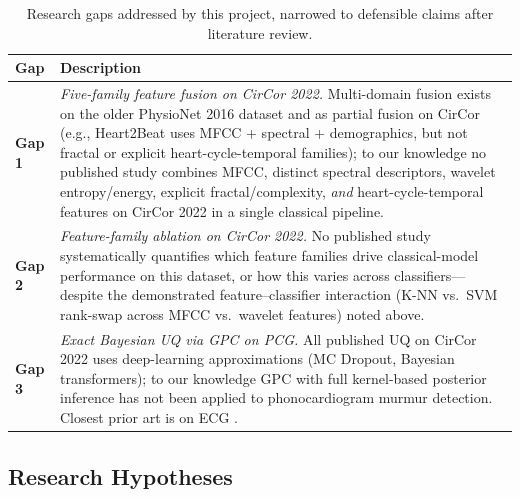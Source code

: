 \documentclass[10pt,twocolumn]{article}
\begin{document}
\begin{table}[H]
\centering
\caption{Research gaps addressed by this project, narrowed to defensible claims after literature review.}
\label{tab:gaps}
\small
\begin{tabular}{p{1.2cm}p{5.8cm}}
\toprule
\textbf{Gap} & \textbf{Description} \\
\midrule
\textbf{Gap 1} & \textit{Five-family feature fusion on CirCor 2022.} Multi-domain fusion exists on the older PhysioNet 2016 dataset and as partial fusion on CirCor (e.g., Heart2Beat \citep{rohr2024heart2beat} uses MFCC + spectral + demographics, but not fractal or explicit heart-cycle-temporal families); to our knowledge no published study combines MFCC, distinct spectral descriptors, wavelet entropy/energy, explicit fractal/complexity, \textit{and} heart-cycle-temporal features on CirCor 2022 in a single classical pipeline. \\
\midrule
\textbf{Gap 2} & \textit{Feature-family ablation on CirCor 2022.} No published study systematically quantifies which feature families drive classical-model performance on this dataset, or how this varies across classifiers---despite the demonstrated feature--classifier interaction (K-NN vs.\ SVM rank-swap across MFCC vs.\ wavelet features) noted above. \\
\midrule
\textbf{Gap 3} & \textit{Exact Bayesian UQ via GPC on PCG.} All published UQ on CirCor 2022 uses deep-learning approximations (MC Dropout, Bayesian transformers); to our knowledge GPC with full kernel-based posterior inference has not been applied to phonocardiogram murmur detection. Closest prior art is on ECG \citep{muygps2024}. \\
\bottomrule
\end{tabular}
\end{table}

\subsection{Research Hypotheses}
\end{document}
